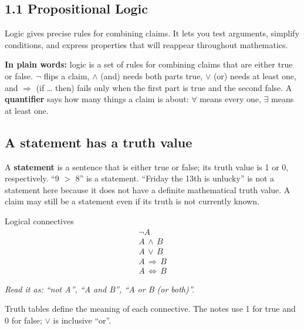 \documentclass[11pt]{article}
\begin{document}
\begin{keepsection}
\section{1.1 Propositional Logic}

Logic gives precise rules for combining claims. It lets you test arguments, simplify conditions, and express properties that will reappear throughout mathematics.

\begin{plainbox}\textbf{In plain words:} logic is a set of rules for combining claims that are either true or false. \ensuremath{\neg} flips a claim, \ensuremath{\land} (and) needs both parts true, \ensuremath{\lor} (or) needs at least one, and \ensuremath{\Rightarrow} (if … then) fails only when the first part is true and the second false. A \textbf{quantifier} says how many things a claim is about: \ensuremath{\forall} means every one, \ensuremath{\exists} means at least one.\end{plainbox}

\begin{keepsection}
\subsection{A statement has a truth value}

A \textbf{statement} is a sentence that is either true or false; its truth value is 1 or 0, respectively. “9 \ensuremath{>} 8” is a statement. “Friday the 13th is unlucky” is not a statement here because it does not have a definite mathematical truth value. A claim may still be a statement even if its truth is not currently known.

\begin{equationcard}{Logical connectives}
\[ \begin{gathered} \neg {A} \\ {A}\, \land \, {B} \\ {A}\, \lor \, {B} \\ {A}\, \Rightarrow \, {B} \\ {A}\, \Leftrightarrow \, {B} \end{gathered} \]
{\small \emph{Read it as: “not A”, “A and B”, “A or B (or both)”.}\par Truth tables define the meaning of each connective. The notes use 1 for true and 0 for false; \ensuremath{\lor} is inclusive “or”.}
\end{equationcard}


\end{keepsection}
\end{keepsection}
\end{document}
